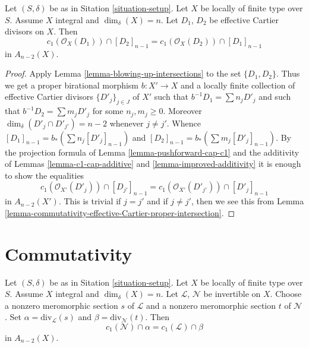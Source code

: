 \begin{lemma}
\label{lemma-commutativity-effective-Cartier}
Let $(S, \delta)$ be as in Sitation \ref{situation-setup}.
Let $X$ be locally of finite type over $S$.
Assume $X$ integral and $\dim_\delta(X) = n$.
Let $D_1$, $D_2$ be effective Cartier divisors on $X$.
Then
$$
c_1(\mathcal{O}_X(D_1)) \cap [D_2]_{n - 1}
=
c_1(\mathcal{O}_X(D_2)) \cap [D_1]_{n - 1}
$$
in $A_{n - 2}(X)$.
\end{lemma}

\begin{proof}
Apply Lemma \ref{lemma-blowing-up-intersections} to the set $\{D_1, D_2\}$.
Thus we get a proper birational morphism $b : X' \to X$
and a locally finite collection of effective Cartier
divisors $\{D'_j\}_{j \in J}$ of $X'$ such that
$b^{-1}D_1 = \sum n_j D'_j$ and such that
$b^{-1}D_2 = \sum m_j D'_j$ for some $n_j, m_j \geq 0$.
Moreover $\dim_\delta(D'_j \cap D'_{j'}) = n - 2$ whenever
$j \not = j'$.
Whence $[D_1]_{n - 1} = b_* ( \sum n_j[D'_j]_{n - 1} )$
and $[D_2]_{n - 1} = b_* ( \sum m_j[D'_j]_{n - 1} )$.
By the projection formula of Lemma \ref{lemma-pushforward-cap-c1}
and the additivity of Lemmas \ref{lemma-c1-cap-additive}
and \ref{lemma-improved-additivity}
it is enough to show the equalities
$$
c_1(\mathcal{O}_{X'}(D'_j)) \cap [D_{j'}]_{n - 1}
=
c_1(\mathcal{O}_{X'}(D'_{j'})) \cap [D'_j]_{n - 1}
$$
in $A_{n - 2}(X')$. This is trivial if $j = j'$ and
if $j \not = j'$, then we see this from
Lemma \ref{lemma-commutativity-effective-Cartier-proper-intersection}.
\end{proof}








\section{Commutativity}
\label{section-commutativity}



\begin{lemma}
\label{lemma-commutativity-on-integral}
Let $(S, \delta)$ be as in Sitation \ref{situation-setup}.
Let $X$ be locally of finite type over $S$.
Assume $X$ integral and $\dim_\delta(X) = n$.
Let $\mathcal{L}$, $\mathcal{N}$ be invertible on $X$.
Choose a nonzero meromorphic section $s$ of $\mathcal{L}$
and a nonzero meromorphic section $t$ of $\mathcal{N}$.
Set $\alpha = \text{div}_{\mathcal{L}}(s)$ and
$\beta = \text{div}_{\mathcal{N}}(t)$.
Then
$$
c_1(\mathcal{N}) \cap \alpha
=
c_1(\mathcal{L}) \cap \beta
$$
in $A_{n - 2}(X)$.
\end{lemma}


